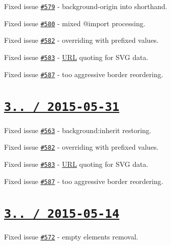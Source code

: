 \begin{DoxyItemize}
\item Fixed issue \href{https://github.com/jakubpawlowicz/clean-css/issues/579}{\tt \#579} -\/ {\ttfamily background-\/origin} into shorthand.
\item Fixed issue \href{https://github.com/jakubpawlowicz/clean-css/issues/580}{\tt \#580} -\/ mixed {\ttfamily @import} processing.
\item Fixed issue \href{https://github.com/jakubpawlowicz/clean-css/issues/582}{\tt \#582} -\/ overriding with prefixed values.
\item Fixed issue \href{https://github.com/jakubpawlowicz/clean-css/issues/583}{\tt \#583} -\/ \mbox{\hyperlink{namespace_u_r_l}{U\+RL}} quoting for S\+VG data.
\item Fixed issue \href{https://github.com/jakubpawlowicz/clean-css/issues/587}{\tt \#587} -\/ too aggressive {\ttfamily border} reordering.
\end{DoxyItemize}

\section*{\href{https://github.com/jakubpawlowicz/clean-css/compare/v3.2.10...v3.2.11}{\tt 3.. / 2015-\/05-\/31} }


\begin{DoxyItemize}
\item Fixed issue \href{https://github.com/jakubpawlowicz/clean-css/issues/563}{\tt \#563} -\/ {\ttfamily background\+:inherit} restoring.
\item Fixed issue \href{https://github.com/jakubpawlowicz/clean-css/issues/582}{\tt \#582} -\/ overriding with prefixed values.
\item Fixed issue \href{https://github.com/jakubpawlowicz/clean-css/issues/583}{\tt \#583} -\/ \mbox{\hyperlink{namespace_u_r_l}{U\+RL}} quoting for S\+VG data.
\item Fixed issue \href{https://github.com/jakubpawlowicz/clean-css/issues/587}{\tt \#587} -\/ too aggressive {\ttfamily border} reordering.
\end{DoxyItemize}

\section*{\href{https://github.com/jakubpawlowicz/clean-css/compare/v3.2.9...v3.2.10}{\tt 3.. / 2015-\/05-\/14} }


\begin{DoxyItemize}
\item Fixed issue \href{https://github.com/jakubpawlowicz/clean-css/issues/572}{\tt \#572} -\/ empty elements removal.
\end{DoxyItemize}

